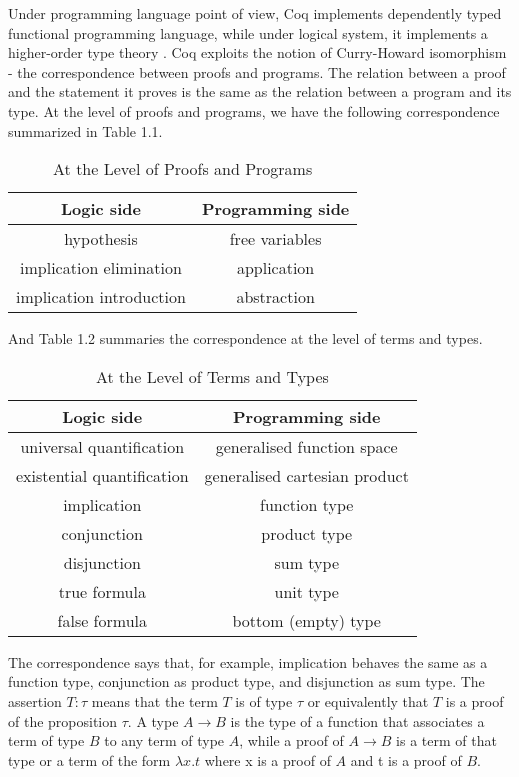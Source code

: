 Under programming language point of view, Coq implements dependently
typed functional programming language, while under logical system, it
implements a higher-order type theory \cite{bertot2004coq}. Coq exploits the notion of Curry-Howard isomorphism - the correspondence between proofs and
programs. The relation between a proof and the statement it proves is
the same as the relation between a program and its type. At the level
of proofs and programs, we have the following correspondence
summarized in Table 1.1.
\begin{table}[h!]
\begin{center}
	\begin{tabular}{|c|c|}
		\hline
		Logic side & Programming side \\ \hline  \hline
		hypothesis & free variables \\ \hline
		implication elimination & application \\ \hline
		implication introduction & abstraction \\ \hline
	\end{tabular}
\end{center}
\caption{At the Level of Proofs and Programs }
\end{table}

And Table 1.2 summaries the correspondence at the level of terms and types.
\begin{table}[h!]
\begin{center}
	\begin{tabular}{|c|c|}
		\hline
			Logic side & Programming side \\ \hline 
			universal quantification & generalised function space \\ \hline
			existential quantification & generalised cartesian product \\ \hline
			implication	& function type \\ \hline
			conjunction	& product type \\ \hline
			disjunction	& sum type \\ \hline
			true formula & unit type \\ \hline
			false formula & bottom (empty) type \\ \hline
	\end{tabular}
\end{center}
\caption{At the Level of Terms and Types}
\end{table}
The correspondence says that, for example, implication behaves the same as a
function type, conjunction as product type, and disjunction as sum
type. %
The assertion $T:\tau$ means that the term $T$ is of type $\tau$ or
equivalently that $T$ is a proof of the proposition $\tau$.   A type $A \rightarrow B$
is the type of a function that associates  a term of type $B$ to any
term of type $A$, while a proof of $A \rightarrow B$ is a term of that
type or a term of the form $\lambda x.t$ where x is a proof of $A$ and
t is a proof of $B$. 

